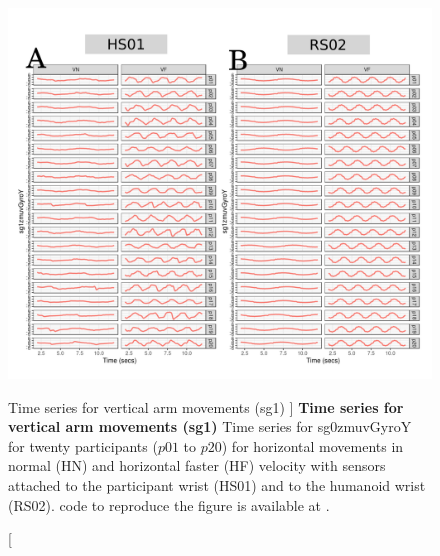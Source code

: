 \begin{figure}
\centering
\includegraphics[width=1.0\textwidth]{ts_V_sg1}
    	\caption
	[Time series for vertical arm movements (sg1) ]{
	{\bf Time series for vertical arm movements (sg1)}
		Time series for sg0zmuvGyroY for twenty participants 
		($p01$ to  $p20$) 
		for horizontal movements in normal (HN) and horizontal faster (HF) 
		velocity with sensors attached to the participant wrist (HS01)
		and to the humanoid wrist (RS02).
	\R code to reproduce the figure is available at 
	.
        }
    \label{fig:aV-sg1}
\end{figure}


